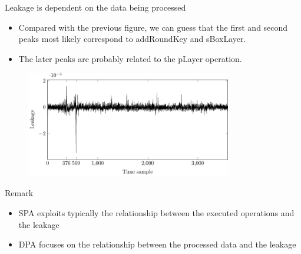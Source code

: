 \begin{frame}{Leakage is dependent on the data being processed}
    \begin{itemize}
       \item Compared with the previous figure, we can guess that the first and second peaks most likely correspond to addRoundKey and sBoxLayer.
       \item The later peaks are probably related to the pLayer operation.
    \end{itemize}
    \begin{figure}[h]
    \centering
    \includegraphics[width=0.8\textwidth]{fig/SCA_PRESENT_bit_dif.pdf}
\end{figure}
\end{frame}

\begin{frame}{Remark}
\begin{itemize}
    \item SPA exploits typically the relationship between the executed operations and the leakage
    \item  DPA focuses on the relationship between the processed data and the leakage
\end{itemize}
\end{frame}

